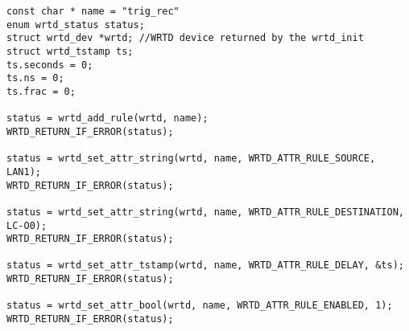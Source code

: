 \begin{lstlisting}[style=CStyle, 
                   caption = Example configuration of the rule for reception the WRTD triggers., 
                   label=cap:trig_rec]
const char * name = "trig_rec"                                                 
enum wrtd_status status;                                                          
struct wrtd_dev *wrtd; //WRTD device returned by the wrtd_init                    
struct wrtd_tstamp ts;                                                            
ts.seconds = 0;                                                                   
ts.ns = 0;                                                                        
ts.frac = 0;                                                                      
                                                                                  
status = wrtd_add_rule(wrtd, name);                                               
WRTD_RETURN_IF_ERROR(status);                                                     
                                                                                  
status = wrtd_set_attr_string(wrtd, name, WRTD_ATTR_RULE_SOURCE, LAN1);           
WRTD_RETURN_IF_ERROR(status);                                                     
                                                                                  
status = wrtd_set_attr_string(wrtd, name, WRTD_ATTR_RULE_DESTINATION, LC-O0);  
WRTD_RETURN_IF_ERROR(status);                                                     
                                                                                  
status = wrtd_set_attr_tstamp(wrtd, name, WRTD_ATTR_RULE_DELAY, &ts);             
WRTD_RETURN_IF_ERROR(status);                                                     
                                                                                  
status = wrtd_set_attr_bool(wrtd, name, WRTD_ATTR_RULE_ENABLED, 1);               
WRTD_RETURN_IF_ERROR(status);   
\end{lstlisting}
